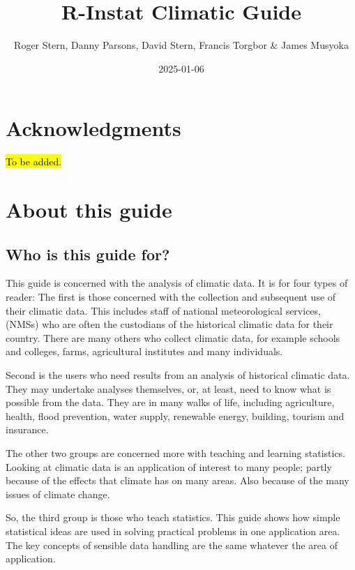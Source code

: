 \documentclass[
  letterpaper,
  DIV=11,
  numbers=noendperiod]{scrreprt}
\title{R-Instat Climatic Guide}
\author{Roger Stern, Danny Parsons, David Stern, Francis Torgbor \&
James Musyoka}
\date{2025-01-06}
\renewcommand*\contentsname{Table of contents}
\newcommand\contentsname{Table of contents}
\begin{document}
\maketitle

\renewcommand*\contentsname{Table of contents}
{
\hypersetup{linkcolor=}
\setcounter{tocdepth}{2}
\tableofcontents
}

\chapter{Acknowledgments}\label{acknowledgments}

\hl{To be added.}


\chapter{About this guide}\label{about-this-guide}

\section{Who is this guide for?}\label{who-is-this-guide-for}

This guide is concerned with the analysis of climatic data. It is for
four types of reader: The first is those concerned with the collection
and subsequent use of their climatic data. This includes staff of
national meteorological services, (NMSs) who are often the custodians of
the historical climatic data for their country. There are many others
who collect climatic data, for example schools and colleges, farms,
agricultural institutes and many individuals.

Second is the users who need results from an analysis of historical
climatic data. They may undertake analyses themselves, or, at least,
need to know what is possible from the data. They are in many walks of
life, including agriculture, health, flood prevention, water supply,
renewable energy, building, tourism and insurance.

The other two groups are concerned more with teaching and learning
statistics. Looking at climatic data is an application of interest to
many people; partly because of the effects that climate has on many
areas. Also because of the many issues of climate change.

So, the third group is those who teach statistics. This guide shows how
simple statistical ideas are used in solving practical problems in one
application area. The key concepts of sensible data handling are the
same whatever the area of application.
\end{document}
